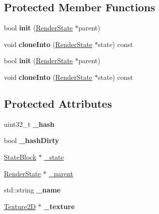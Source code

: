 \subsection*{Protected Member Functions}
\begin{DoxyCompactItemize}
\item 
\mbox{\label{classRenderState_a0764ea75d293b7b8027b0228aa452f87}} 
bool {\bfseries init} (\hyperlink{classRenderState}{Render\+State} $\ast$parent)
\item 
\mbox{\label{classRenderState_a88b904442fd3aa0a5c3958558f92c9db}} 
void {\bfseries clone\+Into} (\hyperlink{classRenderState}{Render\+State} $\ast$state) const
\item 
\mbox{\label{classRenderState_a0764ea75d293b7b8027b0228aa452f87}} 
bool {\bfseries init} (\hyperlink{classRenderState}{Render\+State} $\ast$parent)
\item 
\mbox{\label{classRenderState_a88b904442fd3aa0a5c3958558f92c9db}} 
void {\bfseries clone\+Into} (\hyperlink{classRenderState}{Render\+State} $\ast$state) const
\end{DoxyCompactItemize}
\subsection*{Protected Attributes}
\begin{DoxyCompactItemize}
\item 
\mbox{\label{classRenderState_a7ab5e52fc514e140f4c072244ef7f004}} 
uint32\+\_\+t {\bfseries \+\_\+hash}
\item 
\mbox{\label{classRenderState_a16c50c0ac30afe7bd12391fa1fc49364}} 
bool {\bfseries \+\_\+hash\+Dirty}
\item 
\hyperlink{classRenderState_1_1StateBlock}{State\+Block} $\ast$ \hyperlink{classRenderState_ac40064c8b7e06604366149b9d772e2d5}{\+\_\+state}
\item 
\hyperlink{classRenderState}{Render\+State} $\ast$ \hyperlink{classRenderState_a33a724fc34b35f6934717e1837ec918d}{\+\_\+parent}
\item 
\mbox{\label{classRenderState_a8084229557c3c9e97ccda6b97817c455}} 
std\+::string {\bfseries \+\_\+name}
\item 
\mbox{\label{classRenderState_a7704a856546ff7e9f70eac074bf9983f}} 
\hyperlink{classTexture2D}{Texture2D} $\ast$ {\bfseries \+\_\+texture}
\end{DoxyCompactItemize}
